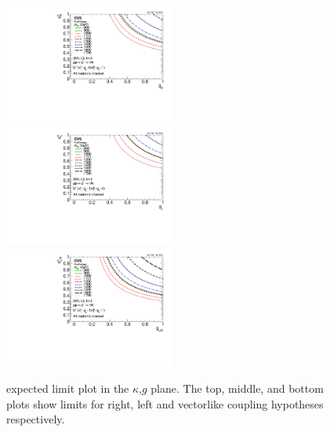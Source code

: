\begin{figure}[htcb]
\centering
\includegraphics[width=0.5\textwidth]{AN-14-049/figs/bayesian_expected_hadronic_right_2Dlimit_plot.pdf}\\
\includegraphics[width=0.5\textwidth]{AN-14-049/figs/bayesian_expected_hadronic_left_2Dlimit_plot.pdf}\\
\includegraphics[width=0.5\textwidth]{AN-14-049/figs/bayesian_expected_hadronic_vector_2Dlimit_plot.pdf}\\
\caption{expected limit plot in the $\kappa$,$g$ plane.  The top, middle, and bottom plots show limits for right, left and vectorlike coupling hypotheses respectively.}
\label{figs:bsthetalimit2dexp}
\end{figure}



\clearpage
